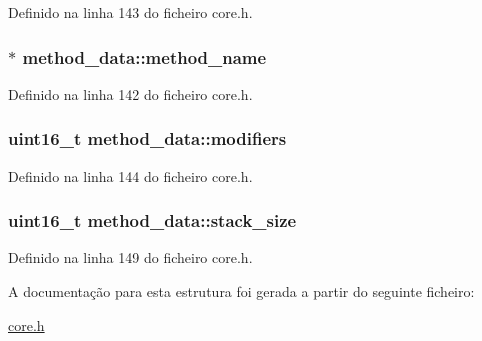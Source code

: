 Definido na linha 143 do ficheiro core.\-h.

\hypertarget{structmethod__data_acc4747daee0a91ee73f94422c8b833ab}{
\subsubsection[{method\-\_\-name}]{$\ast$ method\-\_\-data\-::method\-\_\-name}}\label{structmethod__data_acc4747daee0a91ee73f94422c8b833ab}


Definido na linha 142 do ficheiro core.\-h.

\hypertarget{structmethod__data_a2abb22d9f683ff1163f58d9b071902bd}{
\subsubsection[{modifiers}]{\setlength{\rightskip}{0pt plus 5cm}uint16\-\_\-t method\-\_\-data\-::modifiers}}\label{structmethod__data_a2abb22d9f683ff1163f58d9b071902bd}


Definido na linha 144 do ficheiro core.\-h.

\hypertarget{structmethod__data_a0c23eae5e5fe3302c9c1b7f8e5543e3c}{
\subsubsection[{stack\-\_\-size}]{\setlength{\rightskip}{0pt plus 5cm}uint16\-\_\-t method\-\_\-data\-::stack\-\_\-size}}\label{structmethod__data_a0c23eae5e5fe3302c9c1b7f8e5543e3c}


Definido na linha 149 do ficheiro core.\-h.



A documentação para esta estrutura foi gerada a partir do seguinte ficheiro\-:\begin{DoxyCompactItemize}
\item 
\hyperlink{core_8h}{core.\-h}\end{DoxyCompactItemize}
